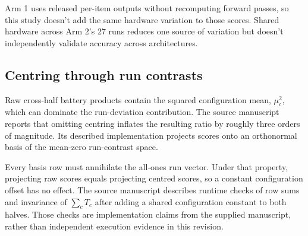 Arm 1 uses released per-item outputs without recomputing forward passes, so this study doesn't add the same hardware variation to those scores. Shared hardware across Arm 2's 27 runs reduces one source of variation but doesn't independently validate accuracy across architectures.

\subsection{Centring through run contrasts}
Raw cross-half battery products contain the squared configuration mean, $\mu_c^2$, which can dominate the run-deviation contribution. The source manuscript reports that omitting centring inflates the resulting ratio by roughly three orders of magnitude. Its described implementation projects scores onto an orthonormal basis of the mean-zero run-contrast space.

Every basis row must annihilate the all-ones run vector. Under that property, projecting raw scores equals projecting centred scores, so a constant configuration offset has no effect. The source manuscript describes runtime checks of row sums and invariance of $\sum_cT_c$ after adding a shared configuration constant to both halves. Those checks are implementation claims from the supplied manuscript, rather than independent execution evidence in this revision.
